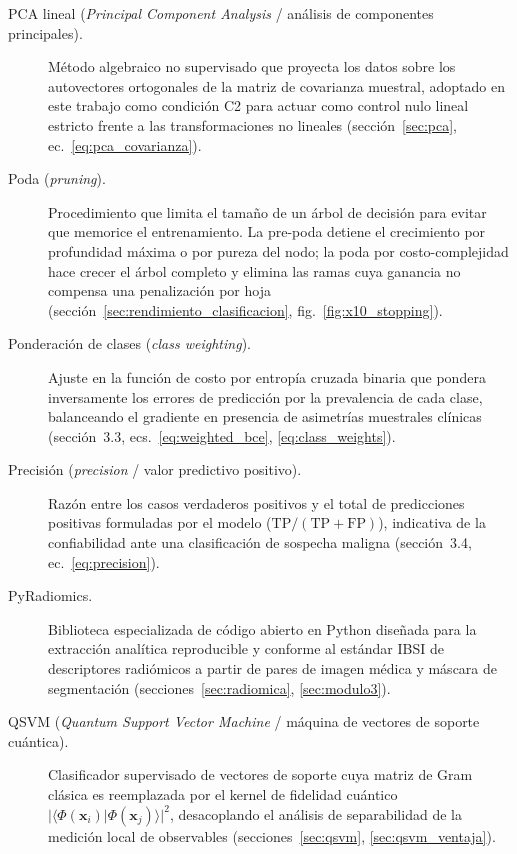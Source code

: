 \begin{description}
  \item[PCA lineal (\textit{Principal Component Analysis} / análisis de componentes principales).] Método algebraico no supervisado que proyecta los datos sobre los autovectores ortogonales de la matriz de covarianza muestral, adoptado en este trabajo como condición C2 para actuar como control nulo lineal estricto frente a las transformaciones no lineales (sección~\ref{sec:pca}, ec.~\ref{eq:pca_covarianza}).

  \item[Poda (\textit{pruning}).] Procedimiento que limita el tamaño de un árbol de decisión para evitar que memorice el entrenamiento. La pre-poda detiene el crecimiento por profundidad máxima o por pureza del nodo; la poda por costo-complejidad hace crecer el árbol completo y elimina las ramas cuya ganancia no compensa una penalización por hoja (sección~\ref{sec:rendimiento_clasificacion}, fig.~\ref{fig:x10_stopping}).

  \item[Ponderación de clases (\textit{class weighting}).] Ajuste en la función de costo por entropía cruzada binaria que pondera inversamente los errores de predicción por la prevalencia de cada clase, balanceando el gradiente en presencia de asimetrías muestrales clínicas (sección~3.3, ecs.~\ref{eq:weighted_bce}, \ref{eq:class_weights}).

  \item[Precisión (\textit{precision} / valor predictivo positivo).] Razón entre los casos verdaderos positivos y el total de predicciones positivas formuladas por el modelo ($\mathrm{TP} / (\mathrm{TP} + \mathrm{FP})$), indicativa de la confiabilidad ante una clasificación de sospecha maligna (sección~3.4, ec.~\ref{eq:precision}).

  \item[PyRadiomics.] Biblioteca especializada de código abierto en Python diseñada para la extracción analítica reproducible y conforme al estándar IBSI de descriptores radiómicos a partir de pares de imagen médica y máscara de segmentación (secciones~\ref{sec:radiomica}, \ref{sec:modulo3}).

  \item[QSVM (\textit{Quantum Support Vector Machine} / máquina de vectores de soporte cuántica).] Clasificador supervisado de vectores de soporte cuya matriz de Gram clásica es reemplazada por el kernel de fidelidad cuántico $|\langle \Phi(\mathbf{x}_i)|\Phi(\mathbf{x}_j)\rangle|^2$, desacoplando el análisis de separabilidad de la medición local de observables (secciones~\ref{sec:qsvm}, \ref{sec:qsvm_ventaja}).


\end{description}
